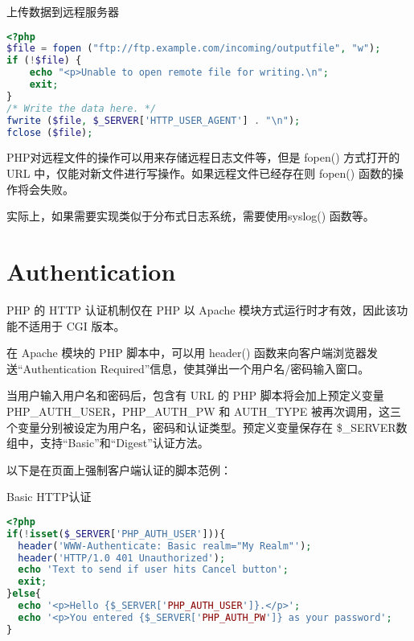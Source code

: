 \begin{example}
上传数据到远程服务器
\begin{lstlisting}[language=PHP]
<?php
$file = fopen ("ftp://ftp.example.com/incoming/outputfile", "w");
if (!$file) {
    echo "<p>Unable to open remote file for writing.\n";
    exit;
}
/* Write the data here. */
fwrite ($file, $_SERVER['HTTP_USER_AGENT'] . "\n");
fclose ($file);
\end{lstlisting}
\end{example}

PHP对远程文件的操作可以用来存储远程日志文件等，但是 fopen() 方式打开的 URL 中，仅能对新文件进行写操作。如果远程文件已经存在则 fopen() 函数的操作将会失败。

实际上，如果需要实现类似于分布式日志系统，需要使用syslog() 函数等。

\section{Authentication}

PHP 的 HTTP 认证机制仅在 PHP 以 Apache 模块方式运行时才有效，因此该功能不适用于 CGI 版本。

在 Apache 模块的 PHP 脚本中，可以用 header() 函数来向客户端浏览器发送“Authentication Required”信息，使其弹出一个用户名/密码输入窗口。

当用户输入用户名和密码后，包含有 URL 的 PHP 脚本将会加上预定义变量 PHP\_AUTH\_USER，PHP\_AUTH\_PW 和 AUTH\_TYPE 被再次调用，这三个变量分别被设定为用户名，密码和认证类型。预定义变量保存在 \$\_SERVER数组中，支持“Basic”和“Digest”认证方法。

以下是在页面上强制客户端认证的脚本范例：

\begin{example}
Basic HTTP认证
\begin{lstlisting}[language=PHP]
<?php
if(!isset($_SERVER['PHP_AUTH_USER'])){
  header('WWW-Authenticate: Basic realm="My Realm"');
  header('HTTP/1.0 401 Unauthorized');
  echo 'Text to send if user hits Cancel button';
  exit;
}else{
  echo '<p>Hello {$_SERVER['PHP_AUTH_USER']}.</p>';
  echo '<p>You entered {$_SERVER['PHP_AUTH_PW']} as your password';
}
\end{lstlisting}
\end{example}


